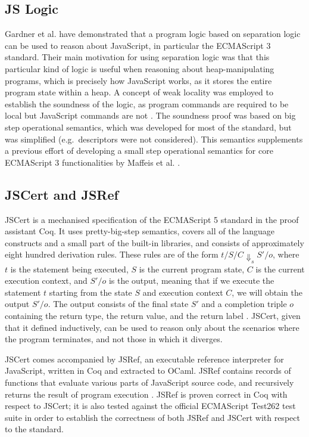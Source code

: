 \documentclass[a4paper,11pt,twoside]{report}
\begin{document}
\subsection{JS Logic}\label{sec:jslogic}
Gardner et al. \cite{Gardner:2012} have demonstrated that a program logic based on separation logic can be used to reason about JavaScript, in particular the ECMAScript 3 standard. Their main motivation for using separation logic was that this particular kind of logic is useful when reasoning about heap-manipulating programs, which is precisely how JavaScript works, as it stores the entire program state within a heap. A concept of weak locality was employed to establish the soundness of the logic, as program commands are required to be local but JavaScript commands are not \cite{Gardner:2012}. The soundness proof was based on big step operational semantics, which was developed for most of the standard, but was simplified (e.g.~descriptors were not considered). This semantics supplements a previous effort of developing a small step operational semantics for core ECMAScript 3 functionalities by Maffeis et al. \cite{Maffeis:2008}.

\subsection{JSCert and JSRef}\label{sec:jscert}
JSCert is a mechanised specification of the ECMAScript 5 standard in the proof assistant Coq\cite{Bodin:2014}. It uses pretty-big-step semantics, covers all of the language constructs and a small part of the built-in libraries, and consists of approximately eight hundred derivation rules. These rules are of the form $t/S/C \Downarrow_s S'/o$, where $t$ is the statement being executed, $S$ is the current program state, $C$ is the current execution context, and $S'/o$ is the output, meaning that if we execute the statement $t$ starting from the state $S$ and execution context $C$, we will obtain the output $S'/o$. The output consists of the final state $S'$ and a completion triple $o$ containing the return type, the return value, and the return label \cite{Bodin:2014}. JSCert, given that it defined inductively, can be used to reason only about the scenarios where the program terminates, and not those in which it diverges. 


JSCert comes accompanied by JSRef, an executable reference interpreter for JavaScript, written in Coq and extracted to OCaml. JSRef contains records of functions that evaluate various parts of JavaScript source code, and recursively returns the result of program execution \cite{Bodin:2014}. JSRef is proven correct in Coq with respect to JSCert; it is also tested against the official ECMAScript Test262 test suite in order to establish the correctness of both JSRef and JSCert with respect to the  standard.
\end{document}
